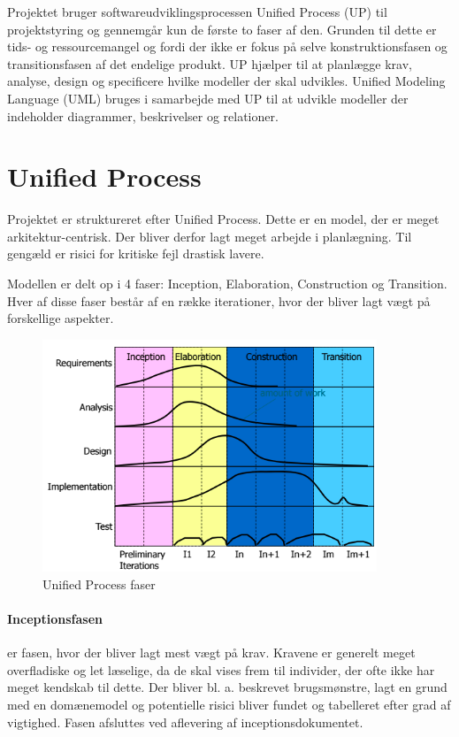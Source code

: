 \begingroup
\let\clearpage\relax
\let\cleardoublepage\relax
\label{Metode}

Projektet bruger softwareudviklingsprocessen Unified Process (UP) til projektstyring og gennemgår kun de første to faser af den. Grunden til dette er tids- og ressourcemangel og fordi der ikke er fokus på selve konstruktionsfasen og transitionsfasen af det endelige produkt. UP hjælper til at planlægge krav, analyse, design og specificere hvilke modeller der skal udvikles. Unified Modeling Language (UML) bruges i samarbejde med UP til at udvikle modeller der indeholder diagrammer, beskrivelser og relationer.

\section{Unified Process}
Projektet er struktureret efter Unified Process. Dette er en model, der er meget arkitektur-centrisk. Der bliver derfor lagt meget arbejde i planlægning. Til gengæld er risici for kritiske fejl drastisk lavere.

Modellen er delt op i 4 faser: Inception, Elaboration, Construction og Transition. Hver af disse faser består af en række iterationer, hvor der bliver lagt vægt på forskellige aspekter.


\begin{figure}
  \includegraphics[width=10cm]{prolog/figurer/UP-Faser.png}
  \caption{Unified Process faser}
  \label{fig:UPFaser}
\end{figure}


\paragraph{Inceptionsfasen} er fasen, hvor der bliver lagt mest vægt på krav. Kravene er generelt meget overfladiske og let læselige, da de skal vises frem til individer, der ofte ikke har meget kendskab til dette. Der bliver bl. a. beskrevet brugsmønstre, lagt en grund med en domænemodel og potentielle risici bliver fundet og tabelleret efter grad af vigtighed. Fasen afsluttes ved aflevering af inceptionsdokumentet.

